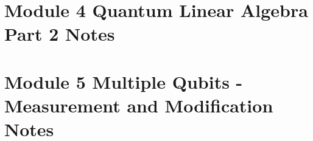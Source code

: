 \section{Module 4 Quantum Linear Algebra Part 2 Notes}


\section{Module 5 Multiple Qubits - Measurement and Modification Notes}


\begin{comment}

\section{Module 1 Quantum Strangeness}


\section{Module 2 Quantum Linear Algebra, Part I}


\section{Module 3 The Single Qubit}


\section{Module 4: Quantum linear algebra, part II}


\section{Module 5: Multiple qubits, part I}


\section{Module 6: Multiple qubits, part II}


\section{Module 7: Interlude: Principles of quantum mechanics}



\end{comment}
